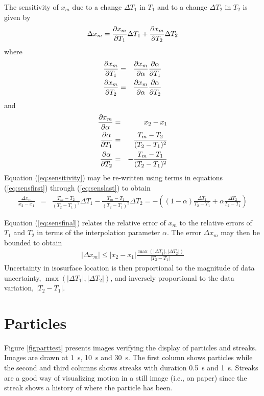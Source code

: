 \documentclass[11pt,twoside]{book}
\begin{document}
\noindent The sensitivity of $x_m$ due to a change $\Delta T_1$ in $T_1$ and to a change $\Delta T_2$ in $T_2$ is given by
\begin{eqnarray}
\Delta x_m= \frac{\partial x_m}{\partial T_1} \Delta T_1 + \frac{\partial x_m}{\partial T_2} \Delta T_2
\label{eq:sensitivity}
\end{eqnarray}
where
\begin{eqnarray}
\frac{\partial x_m}{\partial T_1}&=&\frac{\partial x_m}{\partial \alpha}\frac{\partial \alpha}{\partial T_1} \label{eq:sensfirst}\\
\frac{\partial x_m}{\partial T_2}&=&\frac{\partial x_m}{\partial \alpha}\frac{\partial \alpha}{\partial T_2}
\end{eqnarray}
and
\begin{eqnarray}
\frac{\partial x_m}{\partial \alpha}&=&x_2-x_1\\
\frac{\partial \alpha}{\partial T_1}&=&\frac{T_m-T_2}{(T_2-T_1)^2}\\
\frac{\partial \alpha}{\partial T_2}&=&-\frac{T_m-T_1}{(T_2-T_1)^2}
\label{eq:senslast}
\end{eqnarray}
Equation (\ref{eq:sensitivity}) may be re-written using terms in equations (\ref{eq:sensfirst}) through (\ref{eq:senslast}) to obtain
\begin{eqnarray}
\frac{\Delta x_m}{x_2-x_1}&=&\frac{T_m-T_2}{(T_2-T_1)^2}\Delta T_1-
\frac{T_m-T_1}{(T_2-T_1)^2}\Delta T_2
=-\left(
(1-\alpha)\frac{\Delta T_1}{T_2-T_1}+
\alpha\frac{\Delta T_2}{T_2-T_1}\right)
\label{eq:sensfinal}
\end{eqnarray}

\noindent Equation (\ref{eq:sensfinal}) relates the relative error of $x_m$ to the relative errors of $T_1$ and $T_2$ in terms of the interpolation parameter $\alpha$. The error $\Delta x_m$ may then be bounded to obtain
\begin{eqnarray}
|\Delta x_m|\le
|x_2-x_1|\frac{\max(|\Delta T_1|,|\Delta T_2|)}{|T_2-T_1|}
\end{eqnarray}
\noindent Uncertainty in isosurface location is then proportional to the magnitude of data uncertainty, $\max(|\Delta T_1|,|\Delta T_2|)$, and inversely proportional to the data variation, $|T_2-T_1|$.


\clearpage

\section{Particles}

Figure \ref{figparttest} presents images verifying the display of particles and streaks. Images are drawn at \SI{1}{s}, \SI{10}{s} and \SI{30}{s}. The first column shows particles while the second and third columns shows streaks with duration \SI{0.5}{s} and \SI{1}{s}. Streaks are a good way of visualizing motion in a still image (i.e., on paper) since the streak shows a history of where the particle has been.
\end{document}
